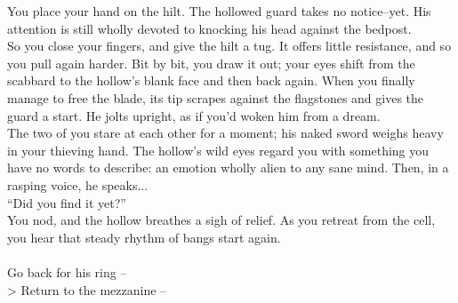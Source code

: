 You place your hand on the hilt. The hollowed guard takes no notice--yet. His attention is still wholly devoted to knocking his head against the bedpost.\\

So you close your fingers, and give the hilt a tug. It offers little resistance, and so you pull again harder. Bit by bit, you draw it out; your eyes shift from the scabbard to the hollow’s blank face and then back again. When you finally manage to free the blade, its tip scrapes against the flagstones and gives the guard a start. He jolts upright, as if you’d woken him from a dream.\\

The two of you stare at each other for a moment; his naked sword weighs heavy in your thieving hand. The hollow’s wild eyes regard you with something you have no words to describe: an emotion wholly alien to any sane mind. Then, in a rasping voice, he speaks...\\

“Did you find it yet?”\\

You nod, and the hollow breathes a sigh of relief. As you retreat from the cell, you hear that steady rhythm of bangs start again.\\
\\

 Go back for his ring -- \\
> Return to the mezzanine -- 
